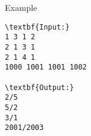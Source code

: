 Example  
\begin{verbatim}
\textbf{Input:}
1 3 1 2
2 1 3 1
2 1 4 1
1000 1001 1001 1002

\textbf{Output:}
2/5
5/2
3/1
2001/2003
\end{verbatim}